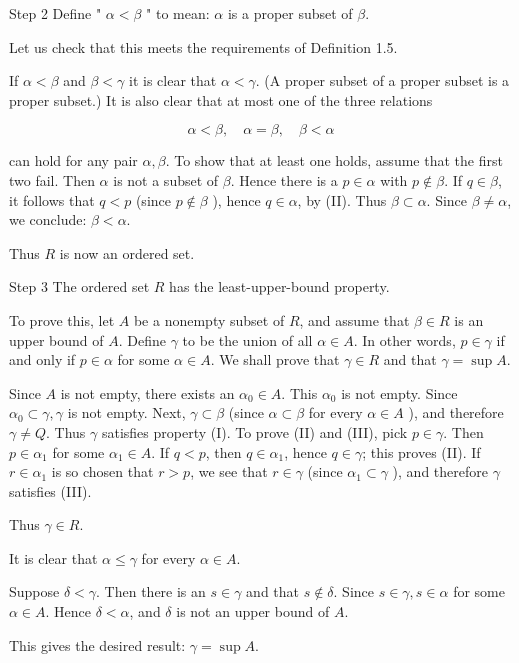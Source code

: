 \documentclass[10pt]{article}
\begin{document}
Step 2 Define " $\alpha<\beta$ " to mean: $\alpha$ is a proper subset of $\beta$.

Let us check that this meets the requirements of Definition 1.5.

If $\alpha<\beta$ and $\beta<\gamma$ it is clear that $\alpha<\gamma$. (A proper subset of a proper subset is a proper subset.) It is also clear that at most one of the three relations

$$
\alpha<\beta, \quad \alpha=\beta, \quad \beta<\alpha
$$

can hold for any pair $\alpha, \beta$. To show that at least one holds, assume that the first two fail. Then $\alpha$ is not a subset of $\beta$. Hence there is a $p \in \alpha$ with $p \notin \beta$. If $q \in \beta$, it follows that $q<p$ (since $p \notin \beta$ ), hence $q \in \alpha$, by (II). Thus $\beta \subset \alpha$. Since $\beta \neq \alpha$, we conclude: $\beta<\alpha$.

Thus $R$ is now an ordered set.

Step 3 The ordered set $R$ has the least-upper-bound property.

To prove this, let $A$ be a nonempty subset of $R$, and assume that $\beta \in R$ is an upper bound of $A$. Define $\gamma$ to be the union of all $\alpha \in A$. In other words, $p \in \gamma$ if and only if $p \in \alpha$ for some $\alpha \in A$. We shall prove that $\gamma \in R$ and that $\gamma=\sup A$.

Since $A$ is not empty, there exists an $\alpha_{0} \in A$. This $\alpha_{0}$ is not empty. Since $\alpha_{0} \subset \gamma, \gamma$ is not empty. Next, $\gamma \subset \beta$ (since $\alpha \subset \beta$ for every $\alpha \in A$ ), and therefore $\gamma \neq Q$. Thus $\gamma$ satisfies property (I). To prove (II) and (III), pick $p \in \gamma$. Then $p \in \alpha_{1}$ for some $\alpha_{1} \in A$. If $q<p$, then $q \in \alpha_{1}$, hence $q \in \gamma$; this proves (II). If $r \in \alpha_{1}$ is so chosen that $r>p$, we see that $r \in \gamma$ (since $\alpha_{1} \subset \gamma$ ), and therefore $\gamma$ satisfies (III).

Thus $\gamma \in R$.

It is clear that $\alpha \leq \gamma$ for every $\alpha \in A$.

Suppose $\delta<\gamma$. Then there is an $s \in \gamma$ and that $s \notin \delta$. Since $s \in \gamma, s \in \alpha$ for some $\alpha \in A$. Hence $\delta<\alpha$, and $\delta$ is not an upper bound of $A$.

This gives the desired result: $\gamma=\sup A$.
\end{document}
